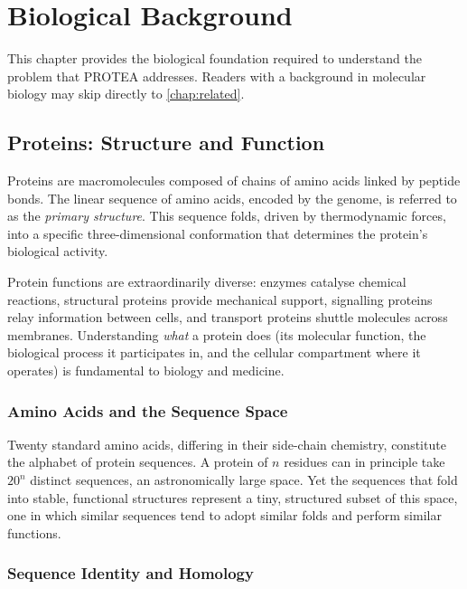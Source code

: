 \chapter{Biological Background}
\label{chap:background}

This chapter provides the biological foundation required to understand the
problem that PROTEA addresses. Readers with a background in molecular biology
may skip directly to \cref{chap:related}.

\section{Proteins: Structure and Function}
\label{sec:proteins}

Proteins are macromolecules composed of chains of amino acids linked by peptide
bonds. The linear sequence of amino acids, encoded by the genome, is referred
to as the \textit{primary structure}. This sequence folds, driven by
thermodynamic forces, into a specific three-dimensional conformation that
determines the protein's biological activity.

Protein functions are extraordinarily diverse: enzymes catalyse chemical
reactions, structural proteins provide mechanical support, signalling proteins
relay information between cells, and transport proteins shuttle molecules across
membranes. Understanding \textit{what} a protein does (its molecular function,
the biological process it participates in, and the cellular compartment where it
operates) is fundamental to biology and medicine.

\subsection{Amino Acids and the Sequence Space}
\label{subsec:amino-acids}

Twenty standard amino acids, differing in their side-chain chemistry, constitute
the alphabet of protein sequences. A protein of $n$ residues can in principle
take $20^n$ distinct sequences, an astronomically large space. Yet the sequences
that fold into stable, functional structures represent a tiny, structured subset
of this space, one in which similar sequences tend to adopt similar folds and
perform similar functions.

\subsection{Sequence Identity and Homology}
\label{subsec:homology}

